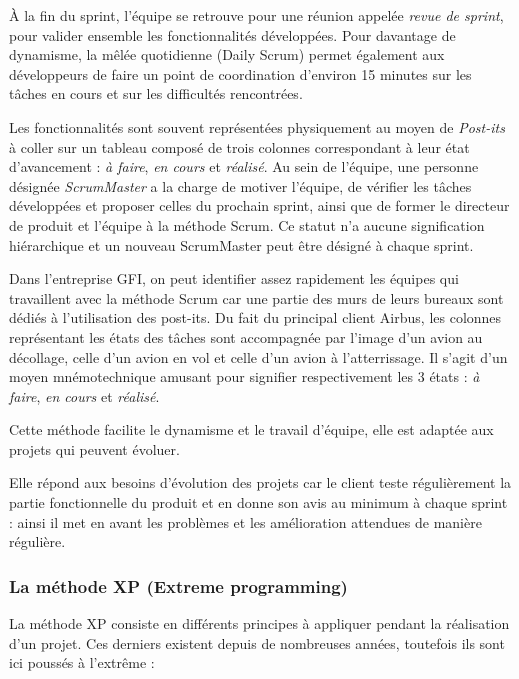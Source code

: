 À la fin du sprint, l'équipe se retrouve pour une réunion appelée \textit{revue de sprint}, pour valider ensemble les fonctionnalités développées.
Pour davantage de dynamisme, la mêlée quotidienne (Daily Scrum) permet également aux développeurs de faire un point de coordination d'environ 15 minutes sur les tâches en cours et sur les difficultés rencontrées.


Les fonctionnalités sont souvent représentées physiquement au moyen de \textit{Post-its} à coller sur un tableau composé de trois colonnes correspondant à leur état d'avancement : \textit{à faire}, \textit{en cours} et \textit{réalisé}. Au sein de l'équipe, une personne désignée \textit{ScrumMaster} a la charge de motiver l'équipe, de vérifier les tâches développées et proposer celles du prochain sprint, ainsi que de former le directeur de produit et l'équipe à la méthode Scrum. Ce statut n'a aucune signification hiérarchique et un nouveau ScrumMaster peut être désigné à chaque sprint.

\begin{app}
Dans l'entreprise GFI, on peut identifier assez rapidement les équipes qui travaillent avec la méthode Scrum car une partie des murs de leurs bureaux sont dédiés à l'utilisation des post-its. Du fait du principal client Airbus, les colonnes représentant les états des tâches sont accompagnée par l'image d'un avion au décollage, celle d'un avion en vol et celle d'un avion à l'atterrissage. Il s'agit d'un moyen mnémotechnique amusant pour signifier respectivement les 3 états : \textit{à faire}, \textit{en cours} et \textit{réalisé}.
\end{app}

Cette méthode facilite le dynamisme et le travail d'équipe, elle est adaptée aux projets qui peuvent évoluer.

Elle répond aux besoins d'évolution des projets car le client teste régulièrement la partie fonctionnelle du produit et en donne son avis au minimum à chaque sprint : ainsi il met en avant les problèmes et les amélioration attendues de manière régulière.

\subsubsection{La méthode XP (Extreme programming)}

La méthode XP consiste en différents principes à appliquer pendant la réalisation d'un projet. Ces derniers existent depuis de nombreuses années, toutefois ils sont ici poussés à l'extrême :

